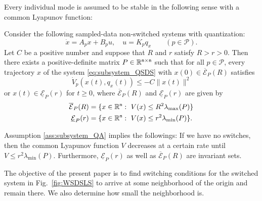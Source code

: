 \documentclass[a4, 11pt]{article}
\begin{document}
Every individual mode is assumed to be 
stable in the following sense with
a common Lyapunov function:
\begin{assumption}
\label{ass:subsystem_QA}
Consider 
the following sampled-data non-switched systems with quantization:
\begin{equation}
\label{eq:subsystem_QSDS}
\dot x = A_px + B_pu, \quad u = K_pq_x \qquad (p \in \mathcal{P}).
\end{equation}
Let $C$ be a positive number and
suppose that $R$ and $r$ satisfy $R > r > 0$. Then
there exists a positive-definite matrix $P \in \mathbb{R}^{\sf n \times n}$
such that for all $p \in \mathcal{P}$, every trajectory $x$ of the system
\eqref{eq:subsystem_QSDS} with $x(0) \in \overline{\mathcal{E}}_P(R)$
satisfies
\begin{equation}
\label{eq:dotVp_bound}
\dot V_p(x(t),q_x(t)) \leq -C \|x(t)\|^2
\end{equation}
or $x(t) \in \underline{\mathcal{E}}_P(r)$ for $t \geq 0$,
where $\overline{\mathcal{E}}_P(R)$ and $\underline{\mathcal{E}}_P(r)$
are given by
\begin{align*}
\overline{\mathcal{E}}_P(R) &= 
\{
x \in \mathbb{R}^{\sf n}:~V(x) \leq R^2\lambda_{\max}(P)
\}\\
\underline{\mathcal{E}}_P(r) &= 
\{
x \in \mathbb{R}^{\sf n}:~V(x) \leq r^2\lambda_{\min}(P)
\}.
\end{align*}
\end{assumption}

Assumption \ref{ass:subsystem_QA} implies the followings:
If we have no switches, then the
common Lyapunov function $V$ decreases
at a certain rate until
$V \leq r^2\lambda_{\min}(P)$. 
Furthermore,
$\underline{\mathcal{E}}_P(r)$
as well as
$\overline{\mathcal{E}}_P(R)$ are invariant sets.

The objective of the present paper is to
find switching conditions for the switched system in Fig.~\ref{fig:WSDSLS} 
to arrive at some neighborhood of the origin and remain there. 
We also determine how small the neighborhood is.
\end{document}
